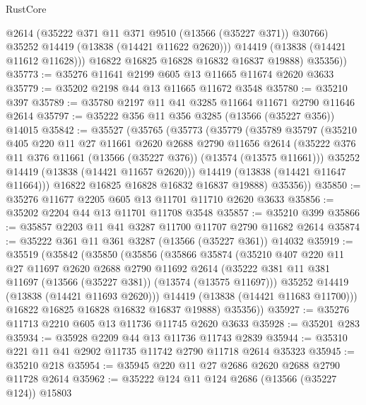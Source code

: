 \begin{lexlean}{RustCore}
\begin{coremodule}
              @2614
              (@35222 @371 @11 @371 @9510 (@13566 (@35227 @371)) @30766)
              @35252
              @14419
              (@13838 (@14421 @11622 @2620)))
            @14419
            (@13838 (@14421 @11612 @11628)))
          @16822
          @16825
          @16828
          @16832
          @16837
          @19888)
        @35356))
@35773 := @35276 @11641 @2199 @605 @13 @11665 @11674 @2620 @3633
@35779 := @35202 @2198 @44 @13 @11665 @11672 @3548
@35780 := @35210 @397
@35789 := @35780 @2197 @11 @41 @3285 @11664 @11671 @2790 @11646 @2614
@35797 := @35222 @356 @11 @356 @3285 (@13566 (@35227 @356)) @14015
@35842 := @35527
    (@35765
      (@35773
        (@35779
          (@35789
            @35797
            (@35210
              @405
              @220
              @11
              @27
              @11661
              @2620
              @2688
              @2790
              @11656
              @2614
              (@35222 @376 @11 @376 @11661 (@13566 (@35227 @376)) (@13574 (@13575 @11661)))
              @35252
              @14419
              (@13838 (@14421 @11657 @2620)))
            @14419
            (@13838 (@14421 @11647 @11664)))
          @16822
          @16825
          @16828
          @16832
          @16837
          @19888)
        @35356))
@35850 := @35276 @11677 @2205 @605 @13 @11701 @11710 @2620 @3633
@35856 := @35202 @2204 @44 @13 @11701 @11708 @3548
@35857 := @35210 @399
@35866 := @35857 @2203 @11 @41 @3287 @11700 @11707 @2790 @11682 @2614
@35874 := @35222 @361 @11 @361 @3287 (@13566 (@35227 @361)) @14032
@35919 := @35519
    (@35842
      (@35850
        (@35856
          (@35866
            @35874
            (@35210
              @407
              @220
              @11
              @27
              @11697
              @2620
              @2688
              @2790
              @11692
              @2614
              (@35222 @381 @11 @381 @11697 (@13566 (@35227 @381)) (@13574 (@13575 @11697)))
              @35252
              @14419
              (@13838 (@14421 @11693 @2620)))
            @14419
            (@13838 (@14421 @11683 @11700)))
          @16822
          @16825
          @16828
          @16832
          @16837
          @19888)
        @35356))
@35927 := @35276 @11713 @2210 @605 @13 @11736 @11745 @2620 @3633
@35928 := @35201 @283
@35934 := @35928 @2209 @44 @13 @11736 @11743 @2839
@35944 := @35310 @221 @11 @41 @2902 @11735 @11742 @2790 @11718 @2614 @35323
@35945 := @35210 @218
@35954 := @35945 @220 @11 @27 @2686 @2620 @2688 @2790 @11728 @2614
@35962 := @35222 @124 @11 @124 @2686 (@13566 (@35227 @124)) @15803

\end{coremodule}
\end{lexlean}
